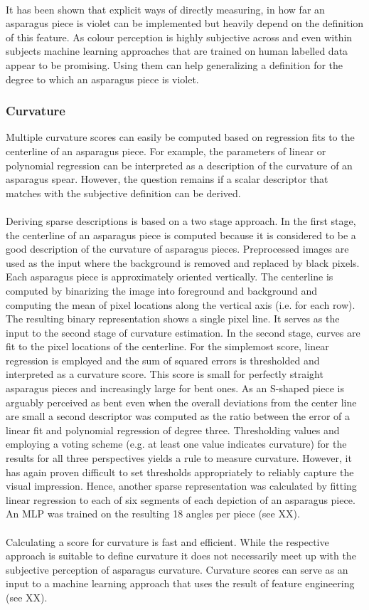 \\
It has been shown that explicit ways of directly measuring, in how far an asparagus piece is violet can be implemented but heavily depend on the definition of this feature. As colour perception is highly subjective across and even within subjects machine learning approaches that are trained on human labelled data appear to be promising. Using them can help generalizing a definition for the degree to which an asparagus piece is violet.

\subsubsection{Curvature}

Multiple curvature scores can easily be computed based on regression fits to the centerline of an asparagus piece. For example, the parameters of linear or polynomial regression can be interpreted as a description of the curvature of an asparagus spear. However, the question remains if a scalar descriptor that matches with the subjective definition can be derived. \\
\\
Deriving sparse descriptions is based on a two stage approach. In the first stage, the centerline of an asparagus piece is computed because it is considered to be a good description of the curvature of asparagus pieces. Preprocessed images are used as the input where the background is removed and replaced by black pixels. Each asparagus piece is approximately oriented vertically. The centerline is computed by binarizing the image into foreground and background and computing the mean of pixel locations along the vertical axis (i.e. for each row). The resulting binary representation shows a single pixel line. It serves as the input to the second stage of curvature estimation.
In the second stage, curves are fit to the pixel locations of the centerline. For the simplemost score, linear regression is employed and the sum of squared errors is thresholded and interpreted as a curvature score. This score is small for perfectly straight asparagus pieces and increasingly large for bent ones. As an S-shaped piece is arguably perceived as bent even when the overall deviations from the center line are small a second descriptor was computed as the ratio between the error of a linear fit and polynomial regression of degree three. Thresholding values and employing a voting scheme (e.g. at least one value indicates curvature) for the results for all three perspectives yields a rule to measure curvature. However, it has again proven difficult to set thresholds appropriately to reliably capture the visual impression. Hence, another sparse representation was calculated by fitting linear regression to each of six segments of each depiction of an asparagus piece. An MLP was trained on the resulting 18 angles per piece (see XX). \\
\\
Calculating a score for curvature is fast and efficient. While the respective approach is suitable to define curvature it does not necessarily meet up with the subjective perception of asparagus curvature. Curvature scores can serve as an input to a machine learning approach that uses the result of feature engineering (see XX).

